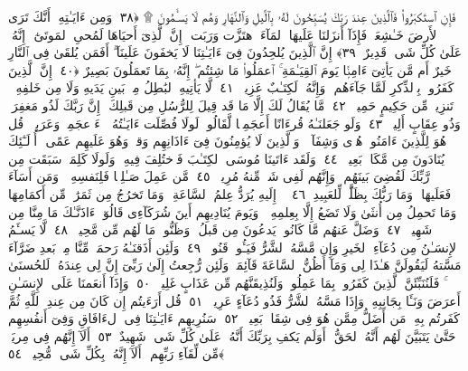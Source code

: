  فَإِنِ ٱستَكبَرُوا۟ فَٱلَّذِينَ عِندَ رَبِّكَ يُسَبِّحُونَ لَهُۥ بِٱلَّيلِ وَٱلنَّهَارِ وَهُم لَا يَسـَٔمُونَ ۩ ﴿٣٨﴾
 وَمِن ءَايَـٰتِهِۦٓ أَنَّكَ تَرَى ٱلأَرضَ خَـٰشِعَةًۭ فَإِذَآ أَنزَلنَا عَلَيهَا ٱلمَآءَ ٱهتَزَّت وَرَبَت ۚ إِنَّ ٱلَّذِىٓ أَحيَاهَا لَمُحىِ ٱلمَوتَىٰٓ ۚ إِنَّهُۥ عَلَىٰ كُلِّ شَىءٍۢ قَدِيرٌ ﴿٣٩﴾
 إِنَّ ٱلَّذِينَ يُلحِدُونَ فِىٓ ءَايَـٰتِنَا لَا يَخفَونَ عَلَينَآ ۗ أَفَمَن يُلقَىٰ فِى ٱلنَّارِ خَيرٌ أَم مَّن يَأتِىٓ ءَامِنًۭا يَومَ ٱلقِيَـٰمَةِ ۚ ٱعمَلُوا۟ مَا شِئتُم ۖ إِنَّهُۥ بِمَا تَعمَلُونَ بَصِيرٌ ﴿٤٠﴾
 إِنَّ ٱلَّذِينَ كَفَرُوا۟ بِٱلذِّكرِ لَمَّا جَآءَهُم ۖ وَإِنَّهُۥ لَكِتَـٰبٌ عَزِيزٌۭ ﴿٤١﴾
 لَّا يَأتِيهِ ٱلبَٰطِلُ مِنۢ بَينِ يَدَيهِ وَلَا مِن خَلفِهِۦ ۖ تَنزِيلٌۭ مِّن حَكِيمٍ حَمِيدٍۢ ﴿٤٢﴾
 مَّا يُقَالُ لَكَ إِلَّا مَا قَد قِيلَ لِلرُّسُلِ مِن قَبلِكَ ۚ إِنَّ رَبَّكَ لَذُو مَغفِرَةٍۢ وَذُو عِقَابٍ أَلِيمٍۢ ﴿٤٣﴾
 وَلَو جَعَلنَـٰهُ قُرءَانًا أَعجَمِيًّۭا لَّقَالُوا۟ لَولَا فُصِّلَت ءَايَـٰتُهُۥٓ ۖ ءَا۬عجَمِىٌّۭ وَعَرَبِىٌّۭ ۗ قُل هُوَ لِلَّذِينَ ءَامَنُوا۟ هُدًۭى وَشِفَآءٌۭ ۖ وَٱلَّذِينَ لَا يُؤمِنُونَ فِىٓ ءَاذَانِهِم وَقرٌۭ وَهُوَ عَلَيهِم عَمًى ۚ أُو۟لَـٰٓئِكَ يُنَادَونَ مِن مَّكَانٍۭ بَعِيدٍۢ ﴿٤٤﴾
 وَلَقَد ءَاتَينَا مُوسَى ٱلكِتَـٰبَ فَٱختُلِفَ فِيهِ ۗ وَلَولَا كَلِمَةٌۭ سَبَقَت مِن رَّبِّكَ لَقُضِىَ بَينَهُم ۚ وَإِنَّهُم لَفِى شَكٍّۢ مِّنهُ مُرِيبٍۢ ﴿٤٥﴾
 مَّن عَمِلَ صَـٰلِحًۭا فَلِنَفسِهِۦ ۖ وَمَن أَسَآءَ فَعَلَيهَا ۗ وَمَا رَبُّكَ بِظَلَّٰمٍۢ لِّلعَبِيدِ ﴿٤٦﴾
 ۞ إِلَيهِ يُرَدُّ عِلمُ ٱلسَّاعَةِ ۚ وَمَا تَخرُجُ مِن ثَمَرَٰتٍۢ مِّن أَكمَامِهَا وَمَا تَحمِلُ مِن أُنثَىٰ وَلَا تَضَعُ إِلَّا بِعِلمِهِۦ ۚ وَيَومَ يُنَادِيهِم أَينَ شُرَكَآءِى قَالُوٓا۟ ءَاذَنَّـٰكَ مَا مِنَّا مِن شَهِيدٍۢ ﴿٤٧﴾
 وَضَلَّ عَنهُم مَّا كَانُوا۟ يَدعُونَ مِن قَبلُ ۖ وَظَنُّوا۟ مَا لَهُم مِّن مَّحِيصٍۢ ﴿٤٨﴾
 لَّا يَسـَٔمُ ٱلإِنسَـٰنُ مِن دُعَآءِ ٱلخَيرِ وَإِن مَّسَّهُ ٱلشَّرُّ فَيَـُٔوسٌۭ قَنُوطٌۭ ﴿٤٩﴾
 وَلَئِن أَذَقنَـٰهُ رَحمَةًۭ مِّنَّا مِنۢ بَعدِ ضَرَّآءَ مَسَّتهُ لَيَقُولَنَّ هَـٰذَا لِى وَمَآ أَظُنُّ ٱلسَّاعَةَ قَآئِمَةًۭ وَلَئِن رُّجِعتُ إِلَىٰ رَبِّىٓ إِنَّ لِى عِندَهُۥ لَلحُسنَىٰ ۚ فَلَنُنَبِّئَنَّ ٱلَّذِينَ كَفَرُوا۟ بِمَا عَمِلُوا۟ وَلَنُذِيقَنَّهُم مِّن عَذَابٍ غَلِيظٍۢ ﴿٥٠﴾
 وَإِذَآ أَنعَمنَا عَلَى ٱلإِنسَـٰنِ أَعرَضَ وَنَـَٔا بِجَانِبِهِۦ وَإِذَا مَسَّهُ ٱلشَّرُّ فَذُو دُعَآءٍ عَرِيضٍۢ ﴿٥١﴾
 قُل أَرَءَيتُم إِن كَانَ مِن عِندِ ٱللَّهِ ثُمَّ كَفَرتُم بِهِۦ مَن أَضَلُّ مِمَّن هُوَ فِى شِقَاقٍۭ بَعِيدٍۢ ﴿٥٢﴾
 سَنُرِيهِم ءَايَـٰتِنَا فِى ٱلءَافَاقِ وَفِىٓ أَنفُسِهِم حَتَّىٰ يَتَبَيَّنَ لَهُم أَنَّهُ ٱلحَقُّ ۗ أَوَلَم يَكفِ بِرَبِّكَ أَنَّهُۥ عَلَىٰ كُلِّ شَىءٍۢ شَهِيدٌ ﴿٥٣﴾
 أَلَآ إِنَّهُم فِى مِريَةٍۢ مِّن لِّقَآءِ رَبِّهِم ۗ أَلَآ إِنَّهُۥ بِكُلِّ شَىءٍۢ مُّحِيطٌۢ ﴿٥٤﴾
 
